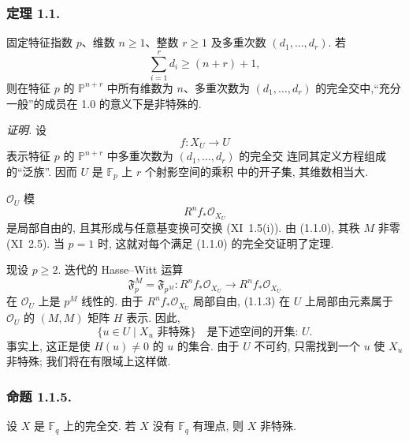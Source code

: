 \subsubsection*{定理 1.1.}
固定特征指数 $p$、维数 $n\geq1$、整数 $r\geq1$ 及多重次数 $(d_1,\dots,d_r)$. 若
\begin{equation}\tag{1.1.0}
\sum_{i=1}^{r}d_i\geq(n+r)+1,
\end{equation}
则在特征 $p$ 的 $\mathbb P^{n+r}$ 中所有维数为 $n$、多重次数为 $(d_1,\dots,d_r)$
的完全交中,“充分一般”的成员在 1.0 的意义下是非特殊的.

\medskip
\noindent\emph{证明.}
设
\begin{equation}\tag{1.1.1}
f:X_U\longrightarrow U
\end{equation}
表示特征 $p$ 的 $\mathbb P^{n+r}$ 中多重次数为 $(d_1,\dots,d_r)$ 的完全交
连同其定义方程组成的“泛族”. 因而 $U$ 是 $\mathbb F_p$ 上 $r$ 个射影空间的乘积
中的开子集, 其维数相当大.

$\mathcal O_U$ 模
\begin{equation}\tag{1.1.2}
R^nf_*\mathcal O_{X_U}
\end{equation}
是局部自由的, 且其形成与任意基变换可交换 (XI~1.5(i)). 由 (1.1.0),
其秩 $M$ 非零 (XI~2.5). 当 $p=1$ 时, 这就对每个满足 (1.1.0) 的完全交证明了定理.

现设 $p\geq2$. 迭代的 Hasse--Witt 运算
\begin{equation}\tag{1.1.3}
\mathfrak F_p^M=\mathfrak F_{p^M}:
R^nf_*\mathcal O_{X_U}\longrightarrow R^nf_*\mathcal O_{X_U}
\end{equation}
在 $\mathcal O_U$ 上是 $p^M$ 线性的. 由于 $R^nf_*\mathcal O_{X_U}$ 局部自由,
(1.1.3) 在 $U$ 上局部由元素属于 $\mathcal O_U$ 的 $(M,M)$ 矩阵 $H$ 表示. 因此,
\begin{equation}\tag{1.1.4}
\{u\in U\mid X_u\text{ 非特殊}\}\quad\text{是下述空间的开集: }U.
\end{equation}
事实上, 这正是使 $H(u)\ne0$ 的 $u$ 的集合. 由于 $U$ 不可约,
只需找到一个 $u$ 使 $X_u$ 非特殊; 我们将在有限域上这样做.

\subsubsection*{命题 1.1.5.}
设 $X$ 是 $\mathbb F_q$ 上的完全交. 若 $X$ 没有 $\mathbb F_q$ 有理点, 则 $X$ 非特殊.

